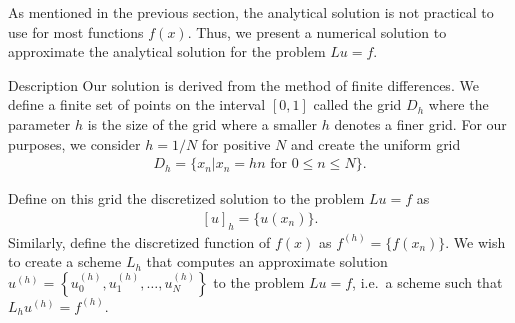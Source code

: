 As mentioned in the previous section, the analytical solution is not practical
to use for most functions $f(x)$. Thus, we present a numerical solution to
approximate the analytical solution for the problem $Lu = f$.

\begin{subsection}{Description}
  Our solution is derived from the method of finite differences. We define
  a finite set of points on the interval $[0, 1]$ called the grid $D_h$ where
  the parameter $h$ is the size of the grid where a smaller $h$ denotes a finer
  grid. For our purposes, we consider $h=1/N$ for positive $N$ and
  create the uniform grid
  \begin{align}\label{uniform_grid}
    D_h = \{x_n| x_n = hn \text{ for $0 \leq n \leq N$}\}.
  \end{align}

  Define on this grid the discretized solution to the problem $Lu = f$ as
  \begin{align}\label{discretized_solution}
    [u]_h = \{u(x_n)\}.
  \end{align}
  Similarly, define the discretized function of $f(x)$ as $f^{(h)} = \{f(x_n)\}$.
  We wish to create a scheme $L_h$ that computes an approximate solution
  $u^{(h)} = \left\{u_0^{(h)}, u_1^{(h)}, \dots, u_N^{(h)}\right\}$ to the problem
  $Lu = f$, i.e.\ a scheme such that $L_h u^{(h)} = f^{(h)}$.


\end{subsection}
